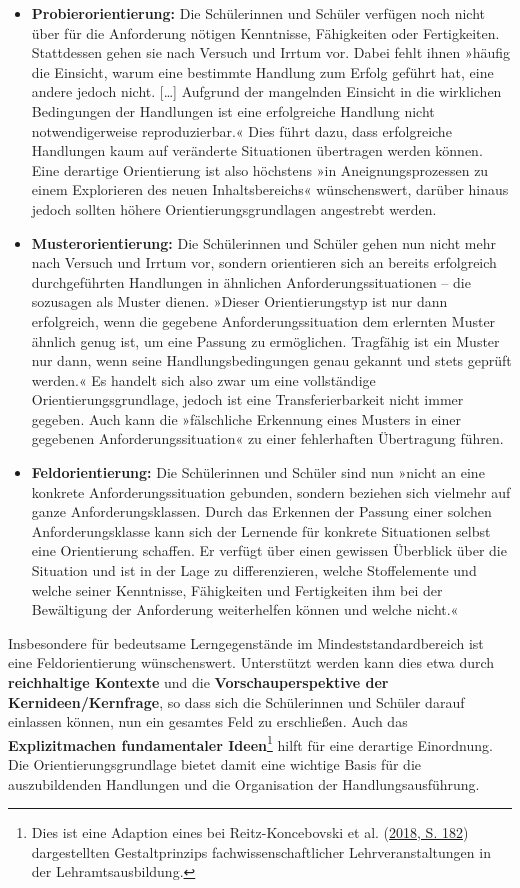 \documentclass[
]{scrbook}
\theoremstyle{definition}
\theoremstyle{definition}
\theoremstyle{definition}
\theoremstyle{definition}
\theoremstyle{remark}
\begin{document}
\begin{itemize}
\item
  \textbf{Probierorientierung:} Die Schülerinnen und Schüler verfügen noch nicht über für die Anforderung nötigen Kenntnisse, Fähigkeiten oder Fertigkeiten. Stattdessen gehen sie nach Versuch und Irrtum vor. Dabei fehlt ihnen »häufig die Einsicht, warum eine bestimmte Handlung zum Erfolg geführt hat, eine andere jedoch nicht. {[}\ldots{]} Aufgrund der mangelnden Einsicht in die wirklichen Bedingungen der Handlungen ist eine erfolgreiche Handlung nicht notwendigerweise reproduzierbar.« Dies führt dazu, dass erfolgreiche Handlungen kaum auf veränderte Situationen übertragen werden können. Eine derartige Orientierung ist also höchstens »in Aneignungsprozessen zu einem Explorieren des neuen Inhaltsbereichs« wünschenswert, darüber hinaus jedoch sollten höhere Orientierungsgrundlagen angestrebt werden.
\item
  \textbf{Musterorientierung:} Die Schülerinnen und Schüler gehen nun nicht mehr nach Versuch und Irrtum vor, sondern orientieren sich an bereits erfolgreich durchgeführten Handlungen in ähnlichen Anforderungssituationen -- die sozusagen als Muster dienen.
  »Dieser Orientierungstyp ist nur dann erfolgreich, wenn die gegebene Anforderungssituation dem erlernten Muster ähnlich genug ist, um eine Passung zu ermöglichen. Tragfähig ist ein Muster nur dann, wenn seine Handlungsbedingungen genau gekannt und stets geprüft werden.«
  Es handelt sich also zwar um eine vollständige Orientierungsgrundlage, jedoch ist eine Transferierbarkeit nicht immer gegeben. Auch kann die »fälschliche Erkennung eines Musters in einer gegebenen Anforderungssituation« zu einer fehlerhaften Übertragung führen.
\item
  \textbf{Feldorientierung:} Die Schülerinnen und Schüler sind nun »nicht an eine konkrete Anforderungssituation gebunden, sondern beziehen sich vielmehr auf ganze Anforderungsklassen. Durch das Erkennen der Passung einer solchen Anforderungsklasse kann sich der Lernende für konkrete Situationen selbst eine Orientierung schaffen. Er verfügt über einen gewissen Überblick über die Situation und ist in der Lage zu differenzieren, welche Stoffelemente und welche seiner Kenntnisse, Fähigkeiten und Fertigkeiten ihm bei der Bewältigung der Anforderung weiterhelfen können und welche nicht.«
\end{itemize}

Insbesondere für bedeutsame Lerngegenstände im Mindeststandardbereich ist eine Feldorientierung wünschenswert. Unterstützt werden kann dies etwa durch \textbf{reichhaltige Kontexte} und die \textbf{Vorschauperspektive der Kernideen/Kernfrage}, so dass sich die Schülerinnen und Schüler darauf einlassen können, nun ein gesamtes Feld zu erschließen. Auch das \textbf{Explizitmachen fundamentaler Ideen}\footnote{Dies ist eine Adaption eines bei Reitz-Koncebovski et al. (\protect\hyperlink{ref-Reitz-Koncebovski2018}{2018, S. 182}) dargestellten Gestaltprinzips fachwissenschaftlicher Lehrveranstaltungen in der Lehramtsausbildung.} hilft für eine derartige Einordnung. Die Orientierungsgrundlage bietet damit eine wichtige Basis für die auszubildenden Handlungen und die Organisation der Handlungsausführung.
\end{document}
